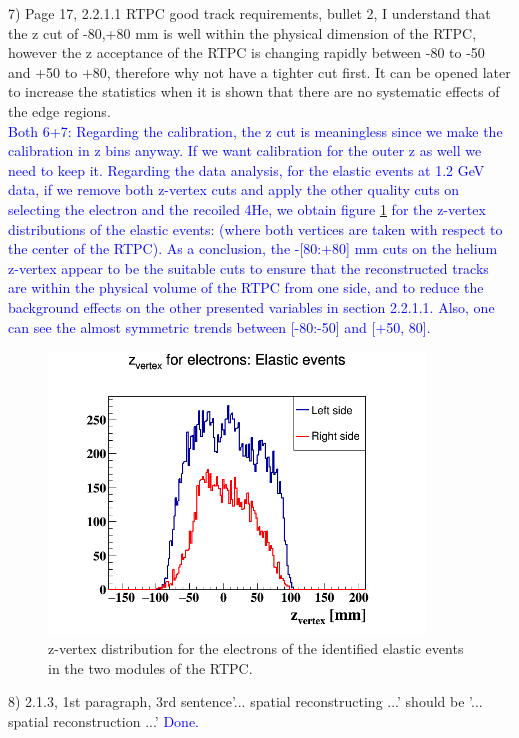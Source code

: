 7) Page 17, 2.2.1.1 RTPC good track requirements, bullet 2, I understand that 
the z cut of -80,+80 mm is well within the physical dimension of the RTPC,  
however the z  acceptance of the RTPC is changing rapidly between -80 to -50 
and +50 to +80, therefore why not have a  tighter cut first. It can be opened 
later to increase the statistics when it is shown that there are no systematic 
effects of the edge regions. \\
\textcolor{blue}{
 Both 6+7: Regarding the calibration, the z cut is meaningless since we make 
 the calibration in z bins anyway. If we want calibration for the outer z as 
 well we need to keep it. Regarding the data analysis, for the elastic events 
 at 1.2 GeV data, if we remove both z-vertex cuts and apply the other quality 
 cuts on selecting the electron and the recoiled 4He, we obtain figure 
 \ref{fig:elastic_z_vertex} for the z-vertex distributions of the elastic 
 events: (where both vertices are taken with respect to the center of the 
 RTPC).  As a conclusion, the -[80:+80] mm cuts on the helium z-vertex appear 
 to be the suitable cuts to ensure that the reconstructed tracks are within the 
 physical volume of the RTPC from one side, and to reduce the background 
 effects on the other presented variables in section 2.2.1.1.  Also, one can 
 see the almost symmetric trends between [-80:-50] and [+50, 80].  }\\
\begin{figure}[h!]
\centering
\includegraphics[height=7.5cm]{fig/elastic_z_vertex.png}
\caption{z-vertex distribution for the electrons of the identified elastic 
events in the two modules of the RTPC.}
\label{fig:elastic_z_vertex}
 \end{figure}

8) 2.1.3, 1st paragraph, 3rd sentence'... spatial reconstructing ...' should be 
'...  spatial reconstruction ...' \textcolor{blue}{ Done.}


